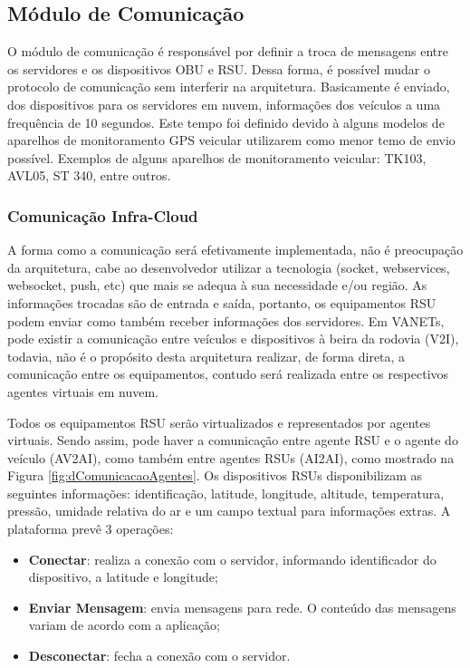 \documentclass[
	12pt,				%
	oneside,			%
	a4paper,			%
	english,			%
	brazil				%
	]{abntex2ppgsi}
\begin{document}
\subsection{Módulo de Comunicação}

O módulo de comunicação é responsável por definir a troca de mensagens entre os servidores e os dispositivos  OBU e RSU. Dessa forma, é possível mudar o protocolo de comunicação sem interferir na arquitetura. Basicamente é enviado, dos dispositivos para os servidores em nuvem, informações dos veículos a uma frequência de 10 segundos. Este tempo foi definido devido à alguns modelos de aparelhos de monitoramento GPS veicular utilizarem como menor temo de envio possível. Exemplos de alguns aparelhos de monitoramento veicular: TK103, AVL05, ST 340, entre outros.

\subsubsection{Comunicação Infra-Cloud}

A forma como a comunicação será efetivamente implementada, não é preocupação da arquitetura, cabe ao desenvolvedor utilizar a tecnologia (socket, webservices, websocket, push, etc) que mais se adequa à sua necessidade e/ou região. As informações trocadas são de entrada e saída, portanto, os equipamentos RSU podem enviar como também receber informações dos servidores. Em VANETs, pode existir a comunicação entre veículos e dispositivos à beira da rodovia (V2I), todavia, não é o propósito desta arquitetura realizar, de forma direta, a comunicação entre os equipamentos, contudo será realizada entre os respectivos agentes virtuais em nuvem. 

Todos os equipamentos RSU serão virtualizados e representados por agentes virtuais. Sendo assim, pode haver a comunicação entre agente RSU e o agente do veículo (AV2AI), como também entre agentes RSUs (AI2AI), como mostrado na Figura \ref{fig:dComunicacaoAgentes}. Os dispositivos RSUs disponibilizam as seguintes informações: identificação, latitude, longitude, altitude, temperatura, pressão, umidade relativa do ar e um campo textual para informações extras. A plataforma prevê  3 operações:

\begin{itemize}
	\item{\textbf{Conectar}: realiza a conexão com o servidor, informando identificador do dispositivo, a latitude e longitude;}	
	\item{\textbf{Enviar Mensagem}: envia mensagens para rede. O conteúdo das mensagens variam de acordo com a aplicação;}	
	\item{\textbf{Desconectar}: fecha a conexão com o servidor.}	
\end{itemize} 
\end{document}
